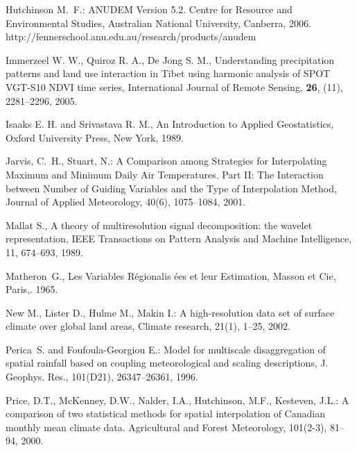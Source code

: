 \documentclass[10pt,letterpaper,conference]{ieeeconf}
\begin{document}
\begin{thebibliography}{999}
 Hutchinson M.~F.: ANUDEM Version
5.2. Centre for Resource and Environmental Studies, Australian National 
University, Canberra, 2006. 
http://fennerschool.anu.edu.au/research/products/anudem 


Immerzeel W. W., Quiroz R. A., De Jong S. M., Understanding precipitation
patterns and land use interaction in Tibet using harmonic analysis of SPOT 
VGT-S10 NDVI time series, International Journal of Remote Sensing, {\bf 26}, 
(11), 2281--2296, 2005.

 Isaaks E. H. and Srivastava R. M.,  An 
Introduction to Applied Geostatistics, Oxford University Press, New York, 
1989.

 Jarvis, C.~H., Stuart, N.:  A Comparison among 
Strategies for Interpolating Maximum and Minimum Daily Air Temperatures. Part 
II: The Interaction between Number of Guiding Variables and the Type of 
Interpolation Method, Journal of Applied Meteorology, 40(6), 1075--1084, 2001. 
 
 Mallat S., A theory of multiresolution signal decomposition: 
the wavelet representation, IEEE Transactions on Pattern Analysis and Machine 
Intelligence, 11, 674--693, 1989.
 
 Matheron~G., Les Variables R\'egionalis \'ees et leur 
Estimation, Masson et Cie, Paris,. 1965.

 New M., Lister D., Hulme M., 
Makin I.: A high-resolution data set of surface climate over global land 
areas, Climate research, 21(1), 1--25, 2002.

Perica~S. and Foufoula-Georgiou E.: Model for multiscale disaggregation of 
spatial rainfall based on coupling meteorological and scaling descriptions, J. 
Geophys. Res., 101(D21), 26347--26361, 1996.

 Price, D.T., McKenney, D.W.,
Nalder, I.A., Hutchinson, M.F., Kesteven, J.L.: A comparison of two 
statistical methods for spatial interpolation of Canadian monthly mean climate 
data. Agricultural and Forest Meteorology, 101(2-3), 81--94, 2000. 



\end{thebibliography}
\end{document}
